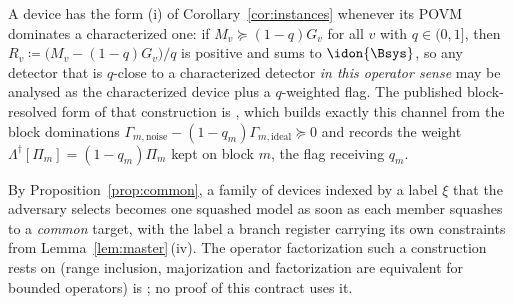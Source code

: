 
\begin{remark}\label{rem:dominating}
A device has the form (i) of Corollary~\ref{cor:instances} whenever its POVM
dominates a characterized one: if $M_v\succeq(1-q)G_v$ for all $v$ with
$q\in(0,1]$, then $R_v\coloneqq\big(M_v-(1-q)G_v\big)/q$ is positive and sums
to $\idon{\Bsys}$, so any detector that is $q$-close to a characterized
detector \emph{in this operator sense} may be analysed as the characterized
device plus a $q$-weighted flag. The published block-resolved form of that
construction is \cite[Thm.~3, Eqs.~(20)--(23)]{nahar2025imperfect}, which
builds exactly this channel from the block dominations
$\Gamma_{m,\text{noise}}-(1-q_m)\Gamma_{m,\text{ideal}}\succeq0$ and records
the weight $\Lambda^{\dagger}[\Pi_m]=(1-q_m)\Pi_m$ kept on block $m$, the flag
receiving $q_m$.

By Proposition~\ref{prop:common}, a family of devices indexed by a label $\xi$
that the adversary selects becomes one squashed model as soon as each member
squashes to a \emph{common} target, with the label a branch register carrying
its own constraints from Lemma~\ref{lem:master}\,(iv). The operator
factorization such a construction rests on (range inclusion, majorization and
factorization are equivalent for bounded operators) is
\cite[Thm.~1]{douglas1966majorization}; no proof of this contract uses it.
\end{remark}
